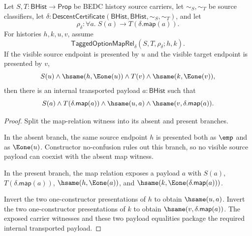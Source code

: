 \begin{theorem}
\label{thm:tagged-option-maprel-visible-payload-readback}
Let $S,T:\mathsf{BHist}\to\mathsf{Prop}$ be BEDC history source carriers, let
$\sim_S,\sim_T$ be source classifiers, let
$\delta:\mathsf{DescentCertificate}(\mathsf{BHist},\mathsf{BHist},\sim_S,\sim_T)$,
and let
$$
\rho_{\delta}:\forall a.\;S(a)\to T(\delta.\mathsf{map}(a)).
$$
For histories $h,k,u,v$, assume
$$
\mathsf{TaggedOptionMapRel}_{\delta}(S,T,\rho_{\delta};h,k).
$$
If the visible source endpoint is presented by $u$ and the visible target
endpoint is presented by $v$,
$$
S(u)\land\hsame(h,\Eone(u))\land
T(v)\land\hsame(k,\Eone(v)),
$$
then there is an internal transported payload $a:\mathsf{BHist}$ such that
$$
S(a)\land T(\delta.\mathsf{map}(a))\land
\hsame(u,a)\land\hsame(v,\delta.\mathsf{map}(a)).
$$
\end{theorem}
\begin{proof}
Split the map-relation witness into its absent and present branches.

In the absent branch, the same source endpoint $h$ is presented both as $\emp$
and as $\Eone(u)$. Constructor no-confusion rules out this branch, so no visible
source payload can coexist with the absent map witness.

In the present branch, the map relation exposes a payload $a$ with $S(a)$,
$T(\delta.\mathsf{map}(a))$, $\hsame(h,\Eone(a))$, and
$\hsame(k,\Eone(\delta.\mathsf{map}(a)))$.

Invert the two one-constructor presentations of $h$ to obtain
$\hsame(u,a)$. Invert the two one-constructor presentations of $k$ to obtain
$\hsame(v,\delta.\mathsf{map}(a))$. The exposed carrier witnesses and these two
payload equalities package the required internal transported payload.
\end{proof}
